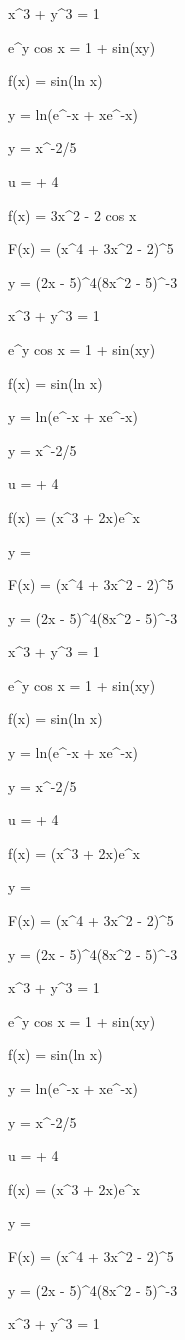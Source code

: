 \documentclass[11pt,a4paper]{article}
\begin{document}
 x^3 + y^3 = 1

 e^y cos x = 1 + sin(xy)

 f(x) = sin(ln x)

 y = ln(e^{-x} + xe^{-x})

y = x^{-2/5}

u =  + 4

f(x) = 3x^2 - 2 cos x


 F(x) = (x^4 + 3x^2 - 2)^5

 y = (2x - 5)^4(8x^2 - 5)^{-3}

 x^3 + y^3 = 1

 e^y cos x = 1 + sin(xy)

 f(x) = sin(ln x)

 y = ln(e^{-x} + xe^{-x})

y = x^{-2/5}

u =  + 4

f(x) = (x^3 + 2x)e^x

y = 

 F(x) = (x^4 + 3x^2 - 2)^5

 y = (2x - 5)^4(8x^2 - 5)^{-3}

 x^3 + y^3 = 1

 e^y cos x = 1 + sin(xy)

 f(x) = sin(ln x)

 y = ln(e^{-x} + xe^{-x})

y = x^{-2/5}

u =  + 4

f(x) = (x^3 + 2x)e^x

y = 

 F(x) = (x^4 + 3x^2 - 2)^5

 y = (2x - 5)^4(8x^2 - 5)^{-3}

 x^3 + y^3 = 1

 e^y cos x = 1 + sin(xy)

 f(x) = sin(ln x)

 y = ln(e^{-x} + xe^{-x})

y = x^{-2/5}

u =  + 4

f(x) = (x^3 + 2x)e^x

y = 

 F(x) = (x^4 + 3x^2 - 2)^5

 y = (2x - 5)^4(8x^2 - 5)^{-3}

 x^3 + y^3 = 1
\end{document}
